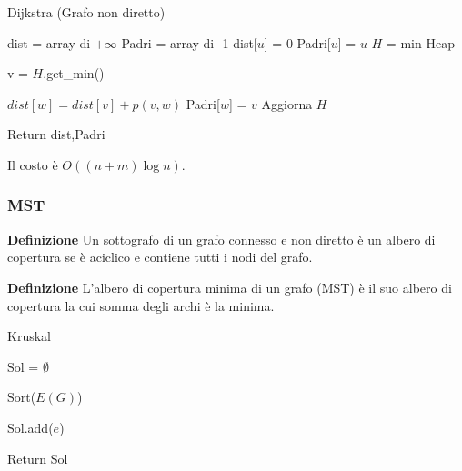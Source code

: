 \documentclass{article}
\begin{document}
\begin{algorithm}[ht]
    \caption{Dijkstra (Grafo non diretto)}
    \begin{algorithmic}
        \State dist = array di $+\infty$
        \State Padri = array di -1
        \State dist[$u$] = 0 
        \State Padri[$u$] = $u$
        \State $H$ = min-Heap 


            \State v = $H.$get\_min() 



                    \State $dist[w]=dist[v]+p(v,w)$
                    \State Padri[$w$] = $v$
                    \State Aggiorna $H$

                \EndIf
                    
            \EndFor

        \EndWhile

        \State Return dist,Padri
        
    \end{algorithmic}
\end{algorithm}

\noindent Il costo è $O((n+m)\log n)$.

\subsubsection{MST}

\noindent\textbf{Definizione} Un sottografo di un grafo connesso e non diretto è un albero di copertura se è aciclico e contiene tutti i nodi del grafo.\newline

\noindent\textbf{Definizione} L'albero di copertura minima di un grafo (MST) è il suo albero di copertura la cui somma degli archi è la minima.\newline

\begin{algorithm}[ht]
    \caption{Kruskal}
    \begin{algorithmic}

    \State Sol = $\emptyset$

    \State Sort($E(G)$)



            \State Sol.add($e$)

        \EndIf
            
    \EndFor

    \State Return Sol
        
    \end{algorithmic}
\end{algorithm}
\end{document}
